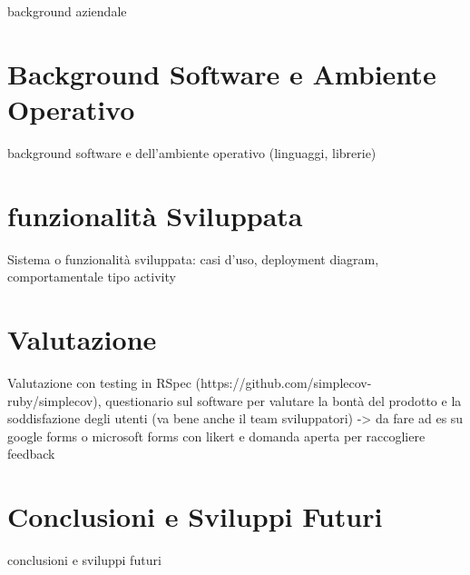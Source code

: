 \documentclass[target=bach,aauheader=,style=]{thud}
\begin{document}
background aziendale

\chapter{Background Software e Ambiente Operativo}

background software e dell'ambiente operativo (linguaggi, librerie)

\chapter{funzionalità Sviluppata}

Sistema o funzionalità sviluppata: casi d'uso, deployment diagram, comportamentale tipo activity

\chapter{Valutazione}

Valutazione con testing in RSpec (https://github.com/simplecov-ruby/simplecov), questionario sul software per valutare
la bontà del prodotto e la soddisfazione degli utenti (va bene anche il team sviluppatori) -> da fare ad es su google forms o
microsoft forms con likert e domanda aperta per raccogliere feedback

\chapter{Conclusioni e Sviluppi Futuri}

conclusioni e sviluppi futuri


\appendix


\end{document}
